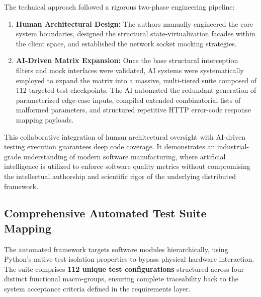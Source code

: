 The technical approach followed a rigorous two-phase engineering pipeline:
\begin{enumerate}
    \item \textbf{Human Architectural Design:} The authors manually engineered the core system boundaries, designed the structural state-virtualization facades within the client space, and established the network socket mocking strategies.
    \item \textbf{AI-Driven Matrix Expansion:} Once the base structural interception filters and mock interfaces were validated, AI systems were systematically employed to expand the matrix into a massive, multi-tiered suite composed of 112 targeted test checkpoints. The AI automated the redundant generation of parameterized edge-case inputs, compiled extended combinatorial lists of malformed parameters, and structured repetitive HTTP error-code response mapping payloads.
\end{enumerate}

This collaborative integration of human architectural oversight with AI-driven testing execution guarantees deep code coverage. It demonstrates an industrial-grade understanding of modern software manufacturing, where artificial intelligence is utilized to enforce software quality metrics without compromising the intellectual authorship and scientific rigor of the underlying distributed framework.

\subsection{Comprehensive Automated Test Suite Mapping}
The automated framework targets software modules hierarchically, using Python's native test isolation properties to bypass physical hardware interaction. The suite comprises \textbf{112 unique test configurations} structured across four distinct functional macro-groups, ensuring complete traceability back to the system acceptance criteria defined in the requirements layer.

